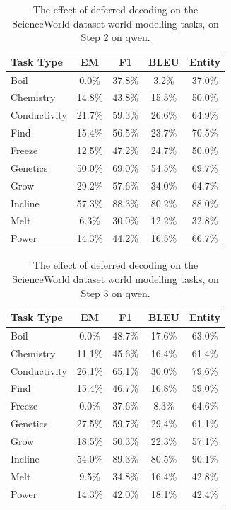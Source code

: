 \begin{table}[h]
\centering
    \setlength\tabcolsep{15pt}
    \setlength\extrarowheight{0pt}
\caption{The effect of deferred decoding on the ScienceWorld dataset \citep{wang-etal-2022-scienceworld} world modelling tasks, on Step 2 on qwen.}
\label{tab:scienceworld37}
\begin{tabular}{lcccc}
\toprule
\textbf{Task Type} & \textbf{EM} & \textbf{F1}
  & \textbf{BLEU} & \textbf{Entity}\\
\midrule
Boil & 0.0\% & 37.8\% & 3.2\% & 37.0\% \\
Chemistry & 14.8\% & 43.8\% & 15.5\% & 50.0\% \\
Conductivity & 21.7\% & 59.3\% & 26.6\% & 64.9\% \\
Find & 15.4\% & 56.5\% & 23.7\% & 70.5\% \\
Freeze & 12.5\% & 47.2\% & 24.7\% & 50.0\% \\
Genetics & 50.0\% & 69.0\% & 54.5\% & 69.7\% \\
Grow & 29.2\% & 57.6\% & 34.0\% & 64.7\% \\
Incline & 57.3\% & 88.3\% & 80.2\% & 88.0\% \\
Melt & 6.3\% & 30.0\% & 12.2\% & 32.8\% \\
Power & 14.3\% & 44.2\% & 16.5\% & 66.7\% \\

\bottomrule
\end{tabular}
\end{table}

\begin{table}[h]
\centering
    \setlength\tabcolsep{15pt}
    \setlength\extrarowheight{0pt}
\caption{The effect of deferred decoding on the ScienceWorld dataset \citep{wang-etal-2022-scienceworld} world modelling tasks, on Step 3 on qwen.}
\label{tab:scienceworld38}
\begin{tabular}{lcccc}
\toprule
\textbf{Task Type} & \textbf{EM} & \textbf{F1}
  & \textbf{BLEU} & \textbf{Entity}\\
\midrule
Boil & 0.0\% & 48.7\% & 17.6\% & 63.0\% \\
Chemistry & 11.1\% & 45.6\% & 16.4\% & 61.4\% \\
Conductivity & 26.1\% & 65.1\% & 30.0\% & 79.6\% \\
Find & 15.4\% & 46.7\% & 16.8\% & 59.0\% \\
Freeze & 0.0\% & 37.6\% & 8.3\% & 64.6\% \\
Genetics & 27.5\% & 59.7\% & 29.4\% & 61.1\% \\
Grow & 18.5\% & 50.3\% & 22.3\% & 57.1\% \\
Incline & 54.0\% & 89.3\% & 80.5\% & 90.1\% \\
Melt & 9.5\% & 34.8\% & 16.4\% & 42.8\% \\
Power & 14.3\% & 42.0\% & 18.1\% & 42.4\% \\

\bottomrule
\end{tabular}
\end{table}


